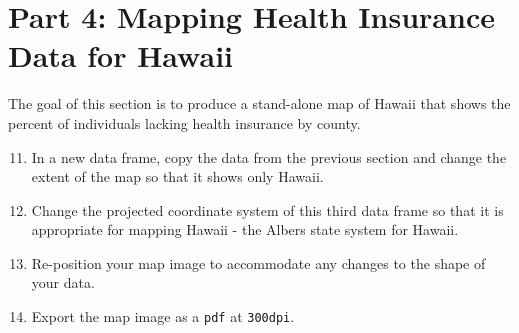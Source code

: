 \documentclass{tufte-handout}
\begin{document}
\vspace{5mm}
\section{Part 4: Mapping Health Insurance Data for Hawaii}
The goal of this section is to produce a stand-alone map of Hawaii that shows the percent of individuals lacking health insurance by county.

\begin{enumerate}
\setcounter{enumi}{10}
\item In a new data frame, copy the data from the previous section and change the extent of the map so that it shows only Hawaii.
\item Change the projected coordinate system of this third data frame so that it is appropriate for mapping Hawaii - the Albers state system for Hawaii.
\item Re-position your map image to accommodate any changes to the shape of your data.
\item Export the map image as a \texttt{pdf} at \texttt{300dpi}.
\end{enumerate}

\end{document}
